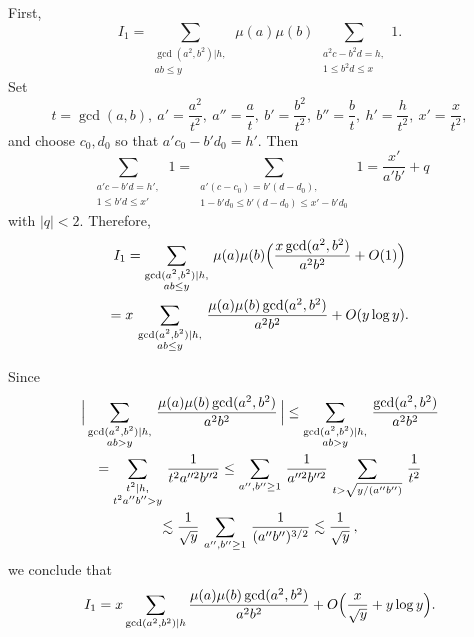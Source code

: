 \documentclass[11pt]{amsart}
\numberwithin{equation}{section}
\begin{document}
First,
$$
I_1 =
\sum_{\substack{\gcd(a^2,b^2)|h,\\ ab\le y}}\, \mu(a)\mu(b)\,
\sum_{\substack{a^2c-b^2d=h,\\1\le b^2d\le x}}1.
$$
Set
\[
t=\gcd(a,b), \ a'=\frac{a^2}{t^2}, \ a''=\frac{a}t, \ b'=\frac{b^2}{t^2}, \ b''=\frac{b}t, \ h'=\frac{h}{t^2},
\ x'=\frac{x}{t^2},
\]
and choose $c_0, d_0$ so that $a'c_0-b'd_0=h'$.
Then
$$
\sum_{\substack{a'c-b'd=h',\\ 1\le b'd\le x'}}\, 1
= \sum_{\substack{a'(c-c_0)=b'(d-d_0),\\1-b'd_0\le b'(d-d_0)\le x'-b'd_0}}\, 1
=\frac{x'}{a'b'}+q
$$
with $|q|<2$.
Therefore,
\begin{multline*}
I_1=\sum_{\substack{\gcd(a^2,b^2)|h,\\ ab\le y}}\,
\mu(a)\mu(b)\Bigl(\frac{x\gcd(a^2,b^2)}{a^2b^2}+O(1)\Bigr) \\
= x\, \sum_{\substack{\gcd(a^2,b^2)|h,\\ab\le y}}\,
\frac{\mu(a)\mu(b)\gcd(a^2,b^2)}{a^2b^2} + O(y\log y).
\end{multline*}

Since
\begin{multline*}
\Bigl|\, \sum_{\substack{\gcd(a^2,b^2)|h,\\ab> y}}\,
\frac{\mu(a)\mu(b)\gcd(a^2,b^2)}{a^2b^2}\, \Bigr| \le  \sum_{\substack{\gcd(a^2,b^2)|h,\\ab> y}}\,
\frac{\gcd(a^2,b^2)}{a^2b^2}\\ =
\sum_{\substack{t^2|h,\\ t^2a''b''> y}}\,
\frac{1}{t^2a''^2b''^2} 
\le \sum_{a'',b''\ge 1}\, \frac{1}{a''^2b''^2}\, \sum_{t>\sqrt{y/(a''b'')}}\, \frac{1}{t^2}
\\ \lesssim
\frac1{\sqrt{y}}\,
\sum_{a'',b''\ge 1}\, \frac{1}{(a''b'')^{3/2}} \lesssim \frac1{\sqrt{y}}\,,
\end{multline*}
we conclude that
$$
I_1= x\sum_{\gcd(a^2,b^2)|h}\frac{\mu(a)\mu(b)\gcd(a^2,b^2)}{a^2b^2}+O\Bigl(\frac{x}{\sqrt y}+y\log y\Bigr).
$$
\end{document}
